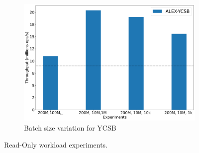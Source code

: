 \documentclass[12pt,a4paper]{article}
\begin{document}
\begin{figure}[htbp]
\begin{subfigure}{0.3\textwidth}
    \end{subfigure}
    \begin{subfigure}{0.35\textwidth}
        \includegraphics[width=\linewidth]{Figures/Batchsize_readonly.png}
        \caption{Batch size variation for YCSB  }
        \label{batch size read only}
    \end{subfigure}

    \caption{Read-Only workload experiments.}
    \label{fig:readonly_experiments}
\end{figure}
\end{document}
